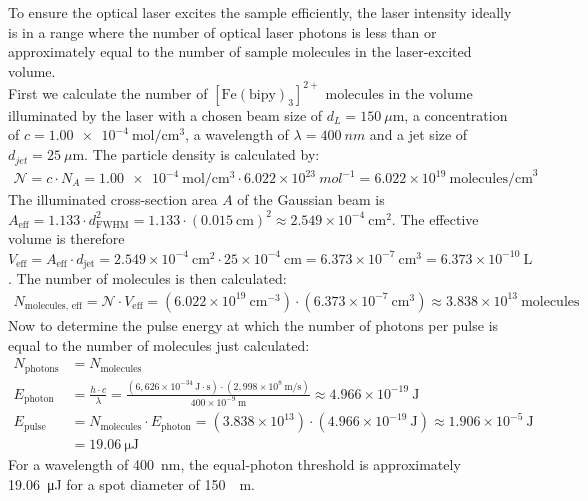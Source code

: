 \documentclass[10pt,a4paper, bibliography=totoc]{scrartcl}
\begin{document}
To ensure the optical laser excites the sample efficiently, the laser intensity ideally is in a range where the number of optical laser photons is less than or approximately equal to the number of sample molecules in the laser-excited volume.\\
First we calculate the number of $[\text{Fe}(\text{bipy})_3]^{2+}$ molecules in the volume illuminated by the laser with a chosen beam size of $d_L=\qty{150}{\mu\m}$, a concentration of $c=\qty{1.00e-4}{\mol\per\cm^3}$, a wavelength of $\lambda=\qty{400}{nm}$ and a jet size of $d_{jet}=\qty{25}{\mu\m}$. The particle density is calculated by:
\begin{align}
	\mathcal{N} = c \cdot N_A = \qty{1.00e-4}{\mol\per\cm^3} \cdot 6.022 \times 10^{23}\ \si{mol^{-1}} = 6.022 \times 10^{19}\ \text{molecules/cm}^3
\end{align}
The illuminated cross-section area $A$ of the Gaussian beam is $A_{\text{eff}} = 1.133 \cdot d_{\text{FWHM}}^2 = 1.133 \cdot (0.015\ \text{cm})^2 \approx 2.549 \times 10^{-4}\ \text{cm}^2$. The effective volume is therefore $V_{\text{eff}} = A_{\text{eff}} \cdot d_{\text{jet}} = 2.549 \times 10^{-4}\ \text{cm}^2 \cdot 25 \times 10^{-4}\ \text{cm} = 6.373 \times 10^{-7}\ \text{cm}^3 = 6.373 \times 10^{-10}\ \text{L}$. The number of molecules is then calculated:
\begin{align}
	N_{\text{molecules, eff}} = \mathcal{N} \cdot V_{\text{eff}} = (6.022 \times 10^{19}\ \text{cm}^{-3}) \cdot (6.373 \times 10^{-7}\ \text{cm}^3) \approx 3.838 \times 10^{13}\ \text{molecules}
\end{align}
Now to determine the pulse energy at which the number of photons per pulse is equal to the number of molecules just calculated:
\begin{align}
	N_{\text{photons}} &= N_{\text{molecules}}\\
	E_{\text{photon}} &= \frac{h \cdot c}{\lambda} = \frac{(6{,}626 \times 10^{-34}\ \text{J}\cdot\text{s}) \cdot (2{,}998 \times 10^8\ \text{m/s})}{400 \times 10^{-9}\ \text{m}} \approx 4.966 \times 10^{-19}\ \text{J}\\
     E_{\text{pulse}} &= N_{\text{molecules}} \cdot E_{\text{photon}}=(3.838 \times 10^{13}) \cdot (4.966 \times 10^{-19}\ \text{J}) \approx 1.906 \times 10^{-5}\ \text{J}\\
     &= \qty{19.06}{\micro\J}
\end{align}
For a wavelength of \qty{400}{nm}, the equal-photon threshold is approximately \qty{19.06}{\micro\J} for a spot diameter of \qty{150}{\mu\m}. 
\end{document}
